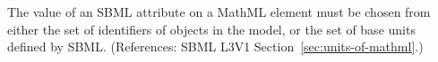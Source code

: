 The value of an SBML  attribute on a MathML  element
must be chosen from either the set of identifiers of \UnitDefinition
objects in the model, or the set of base units defined by SBML.
(References: SBML L3V1 Section~\ref{sec:units-of-mathml}.)
